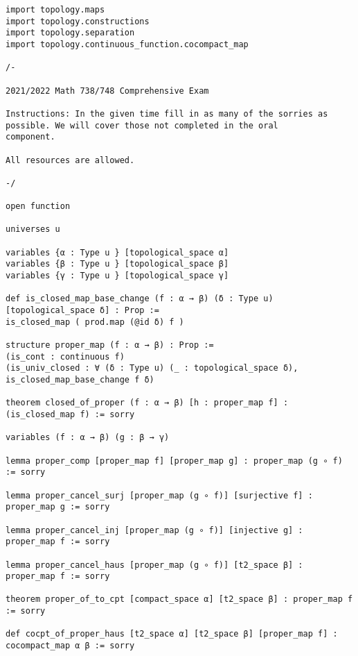 \documentclass{article}
\begin{document}
\begin{lstlisting}
import topology.maps
import topology.constructions
import topology.separation
import topology.continuous_function.cocompact_map

/- 

2021/2022 Math 738/748 Comprehensive Exam 

Instructions: In the given time fill in as many of the sorries as 
possible. We will cover those not completed in the oral 
component.

All resources are allowed. 

-/

open function 

universes u

variables {α : Type u } [topological_space α] 
variables {β : Type u } [topological_space β] 
variables {γ : Type u } [topological_space γ] 

def is_closed_map_base_change (f : α → β) (δ : Type u) [topological_space δ] : Prop := 
is_closed_map ( prod.map (@id δ) f )

structure proper_map (f : α → β) : Prop :=
(is_cont : continuous f)
(is_univ_closed : ∀ (δ : Type u) (_ : topological_space δ), 
is_closed_map_base_change f δ) 

theorem closed_of_proper (f : α → β) [h : proper_map f] : (is_closed_map f) := sorry 

variables (f : α → β) (g : β → γ) 

lemma proper_comp [proper_map f] [proper_map g] : proper_map (g ∘ f) := sorry  

lemma proper_cancel_surj [proper_map (g ∘ f)] [surjective f] : proper_map g := sorry 

lemma proper_cancel_inj [proper_map (g ∘ f)] [injective g] : proper_map f := sorry 

lemma proper_cancel_haus [proper_map (g ∘ f)] [t2_space β] : proper_map f := sorry 

theorem proper_of_to_cpt [compact_space α] [t2_space β] : proper_map f := sorry 

def cocpt_of_proper_haus [t2_space α] [t2_space β] [proper_map f] : cocompact_map α β := sorry 
\end{lstlisting}
\end{document}
